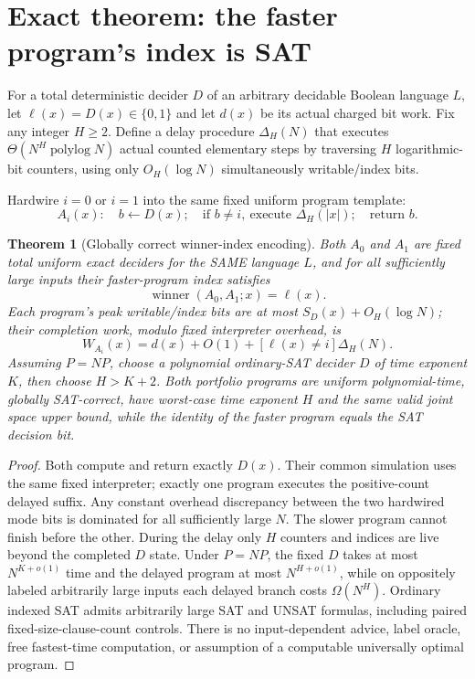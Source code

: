 \documentclass[11pt]{article}
\newtheorem{theorem}{Theorem}
\begin{document}
\section{Exact theorem: the faster program's index is SAT}
For a total deterministic decider \(D\) of an arbitrary decidable Boolean language \(L\), let \(\ell(x)=D(x)\in\{0,1\}\) and let \(d(x)\) be its actual charged bit work. Fix any integer \(H\ge2\). Define a delay procedure \(\Delta_H(N)\) that executes \(\Theta(N^H\operatorname{polylog}N)\) actual counted elementary steps by traversing \(H\) logarithmic-bit counters, using only \(O_H(\log N)\) simultaneously writable/index bits.

Hardwire \(i=0\) or \(i=1\) into the same fixed uniform program template:
\[
A_i(x):\quad b\gets D(x);\quad
\text{if }b\ne i,\ \text{execute }\Delta_H(|x|);\quad
\text{return }b.
\]

\begin{theorem}[Globally correct winner-index encoding]
Both \(A_0\) and \(A_1\) are fixed total uniform exact deciders for the SAME language \(L\), and for all sufficiently large inputs their faster-program index satisfies
\[
\boxed{\operatorname{winner}(A_0,A_1;x)=\ell(x).}
\]
Each program's peak writable/index bits are at most \(S_D(x)+O_H(\log N)\); their completion work, modulo fixed interpreter overhead, is
\[
W_{A_i}(x)=d(x)+O(1)+[\ell(x)\ne i]\Delta_H(N).
\]
Assuming \(P=NP\), choose a polynomial ordinary-SAT decider \(D\) of time exponent \(K\), then choose \(H>K+2\). Both portfolio programs are uniform polynomial-time, globally SAT-correct, have worst-case time exponent \(H\) and the same valid joint space upper bound, while the identity of the faster program equals the SAT decision bit.
\end{theorem}
\begin{proof}
Both compute and return exactly \(D(x)\). Their common simulation uses the same fixed interpreter; exactly one program executes the positive-count delayed suffix. Any constant overhead discrepancy between the two hardwired mode bits is dominated for all sufficiently large \(N\). The slower program cannot finish before the other. During the delay only \(H\) counters and indices are live beyond the completed \(D\) state. Under \(P=NP\), the fixed \(D\) takes at most \(N^{K+o(1)}\) time and the delayed program at most \(N^{H+o(1)}\), while on oppositely labeled arbitrarily large inputs each delayed branch costs \(\Omega(N^H)\). Ordinary indexed SAT admits arbitrarily large SAT and UNSAT formulas, including paired fixed-size-clause-count controls. There is no input-dependent advice, label oracle, free fastest-time computation, or assumption of a computable universally optimal program.
\end{proof}
\end{document}
